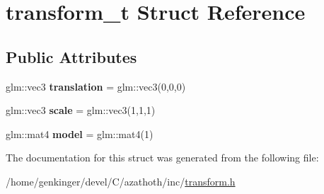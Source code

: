 \hypertarget{structtransform__t}{}\section{transform\+\_\+t Struct Reference}
\label{structtransform__t}
\subsection*{Public Attributes}
\begin{DoxyCompactItemize}
\item 
\mbox{\label{structtransform__t_a1c123363a668b3b10fbb9cd3531565b9}} 
glm\+::vec3 {\bfseries translation} = glm\+::vec3(0,0,0)
\item 
\mbox{\label{structtransform__t_a2450333fbbb3fb9723f5166b69e3e2f6}} 
glm\+::vec3 {\bfseries scale} = glm\+::vec3(1,1,1)
\item 
\mbox{\label{structtransform__t_a892e4adcc366184b8a530b2a39309629}} 
glm\+::mat4 {\bfseries model} = glm\+::mat4(1)
\end{DoxyCompactItemize}


The documentation for this struct was generated from the following file\+:\begin{DoxyCompactItemize}
\item 
/home/genkinger/devel/\+C/azathoth/inc/\mbox{\hyperlink{transform_8h}{transform.\+h}}\end{DoxyCompactItemize}
